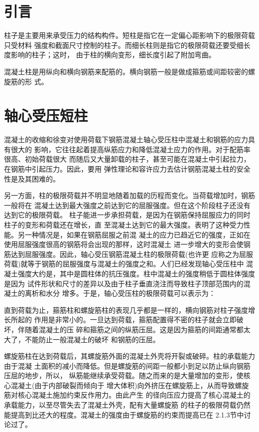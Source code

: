 \documentclass[12pt,a4paper]{book}
\begin{document}
\section{引言}

柱子是主要用来承受压力的结构构件。短柱是指它在一定偏心距影响下的极限荷载只受材料
强度和截面尺寸控制的柱子。而细长柱则是指它的极限荷载还要受细长度影响的柱子；这时，
由于柱的横向变形，细长度引起了附加弯曲。

混凝土柱是用纵向和横向钢筋来配筋的。横向钢筋一般是做成箍筋或间距较密的螺旋筋的形
式。

\section{轴心受压短柱}

混凝土的收缩和徐变对使用荷载下钢筋混凝土轴心受压柱中混凝土和钢筋的应力具有很大的
影响，它往往起着提高纵筋应力和降低混凝土应力的作用。对于配筋率很高、初始荷载很大
而随后又大量卸载的柱子，甚至可能在混凝土中引起拉力，在钢筋中引起压力。因此，要用
弹性理论和容许应力去估计钢筋混凝土柱的安全性是及其困难的。

另一方面，柱的极限荷载并不明显地随着加载的历程而变化。当荷载增加时，钢筋一般将在
混凝土达到最大强度之前达到它的屈服强度。但在这个阶段柱子还没有达到它的极限荷载。
柱子能进一步承担荷载，是因为在钢筋保持屈服应力的同时柱子的变形和荷载还在增长，直
至混凝土达到它的最大强度。表明了这种受力性能。另一种情况是，如果在钢筋屈服之前混
凝土的应力已趋近它的强度，正如在使用屈服强度很高的钢筋将会出现的那样，这时混凝土
进一步增大的变形会使钢筋达到屈服强度。因此，轴心受压钢筋混凝土柱的极限荷载(也许更
应称之为屈服荷载)就等于钢筋的屈服强度与混凝土的强度之和。人们已经发现轴心受压柱中
混凝土强度大约是，其中是圆柱体的抗压强度。柱中混凝土的强度稍低于圆柱体强度是因为
试件形状和尺寸的差异以及由于柱子垂直浇注而导致柱子顶部范围内的混凝土的离析和水分
增多。于是，轴心受压柱的极限荷载可以表示为：

直到荷载为止，箍筋柱和螺旋筋柱的表现几乎都是一样的，横向钢筋对柱子强度增长所起的
作用是非常小的。一旦达到荷载，箍筋配置得不密的柱子就会立即破坏，伴随着混凝土的压
碎和箍筋之间的纵筋压屈。这是因为箍筋的间距通常都太大了，不能防止一般混凝土的破坏
和钢筋的压屈。

螺旋筋柱在达到荷载后，其螺旋筋外面的混凝土外壳将开裂或破碎。柱的承载能力由于混凝
土面积的减小而降低。但是螺旋筋的间距一般都小到足以防止纵向钢筋压屈的地步，所以，
纵筋能继续承受荷载。随之而来的是大量增加的变形，使核心混凝土(由于内部破裂而倾向于
增大体积)向外挤压在螺旋筋上，从而导致螺旋筋对核心混凝土施加约束反作用力。由此产生
的径向压应力提高了核心混凝土的承载能力，以至尽管失去了混凝土外壳，配有大量螺旋筋
的柱子的极限荷载仍然能提高到比还大的程度。混凝土的强度由于螺旋筋的约束而提高已在
2.1.3节中讨论过了。
\end{document}
